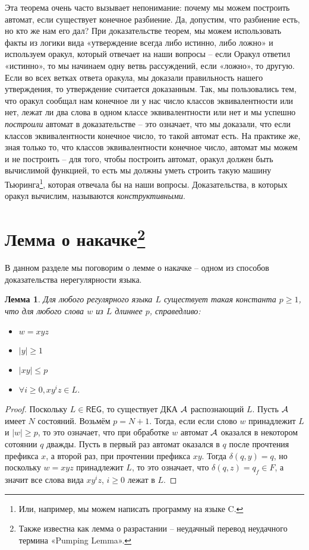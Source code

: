 \documentclass[12pt]{article}
\newtheorem{Lemma}{Лемма}
\theoremstyle{definiton}
\theoremstyle{definition}
\theoremstyle{definition}
\let\leq\leqslant
\let\geq\geqslant
\def\A{{\cal A}}
\def\REG{{\mathsf{REG}}}
\begin{document}
	 Эта теорема очень часто вызывает непонимание: почему мы можем построить автомат, если существует конечное разбиение. Да, допустим, что разбиение есть, но кто же нам его дал?  При доказательстве теорем, мы можем использовать факты из логики вида «утверждение всегда либо истинно, либо ложно» и используем оракул, который отвечает на наши вопросы -- если Оракул ответил «истинно», то мы начинаем одну ветвь рассуждений, если «ложно», то другую. Если во всех ветках ответа оракула, мы доказали правильность нашего утверждения, то утверждение считается доказанным. Так, мы пользовались тем, что оракул сообщал нам конечное ли у нас число классов эквивалентности или нет, лежат ли два слова в одном классе эквивалентности или нет и мы успешно \emph{построили} автомат в доказательстве -- это означает, что мы доказали, что если классов эквивалентности конечное число, то такой автомат есть. На практике же, зная только то, что классов эквивалентности конечное число, автомат мы можем и не построить -- для того, чтобы построить автомат, оракул должен быть вычислимой функцией, то есть мы должны уметь строить такую машину Тьюринга\footnote{Или, например, мы можем написать программу на языке C.}, которая отвечала бы на наши вопросы. Доказательства, в которых оракул вычислим, называются \emph{конструктивными}.

	\section{Лемма о накачке\footnote{Также известна как лемма о разрастании -- неудачный перевод неудачного термина «Pumping Lemma».}}

	В данном разделе мы поговорим о лемме о накачке -- одном из способов доказательства нерегулярности языка.

	\begin{Lemma}
		Для любого регулярного языка $L$ существует такая константа $p \geq 1$, что  для любого слова $w$ из $L$ длиннее $p$, справедливо:
		\begin{itemize}
			\item $w = xyz$
			\item $|y| \geq 1$
			\item $|xy| \leq p$
			\item $\forall i \geq 0, xy^iz \in L  $.
		\end{itemize} 
	\end{Lemma}
	\begin{proof}
		Поскольку $L \in \REG$, то существует ДКА $\A$ распознающий $L$. Пусть $\A$ имеет $N$ состояний. Возьмём $p = N+1$. Тогда, если если слово $w $ принадлежит $ L$  и  $|w| \geq p$, то это означает, что при обработке $w$ автомат $\A$ оказался в некотором сотоянии $q$ дважды. Пусть в первый раз автомат оказался в $q$ после прочтения префикса $x$, а второй раз, при прочтении префикса $xy$. Тогда $\delta(q, y) = q$, но поскольку $w = xyz$ принадлежит $L$, то это означает, что $\delta(q,z) = q_f \in F$, а значит все слова вида $xy^iz$, $i\geq 0$ лежат в $L$.
	\end{proof}
\end{document}
